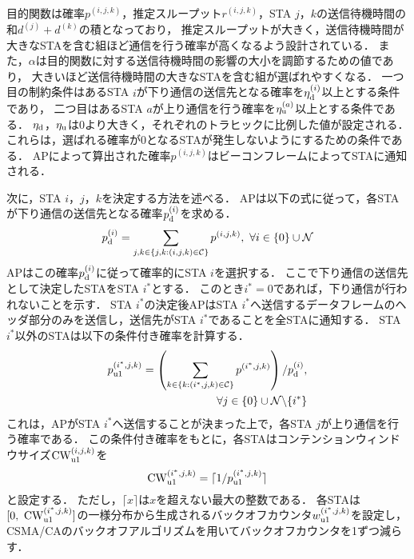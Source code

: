 \documentclass[technicalreport]{ieicej}
\newcommand{\sijk}{(i,j,k)}
\newcommand{\pijk}{p^{(i,j,k)}}
\newcommand{\rijk}{r^{(i,j,k)}}
\newcommand{\mthc}{\mathcal C}
\begin{document}
		\par
		目的関数は確率$\pijk$，推定スループット$\rijk$，STA $j$，$k$の送信待機時間の和$d^{(j)}+d^{(k)}$の積となっており，
		推定スループットが大きく，送信待機時間が大きなSTAを含む組ほど通信を行う確率が高くなるよう設計されている．
		また，$\alpha$は目的関数に対する送信待機時間の影響の大小を調節するための値であり，
		大きいほど送信待機時間の大きなSTAを含む組が選ばれやすくなる．
		一つ目の制約条件はあるSTA $i$が下り通信の送信先となる確率を$\eta_{\rm d}^{(i)}$以上とする条件であり，
		二つ目はあるSTA $a$が上り通信を行う確率を$\eta_{\rm u}^{(a)}$以上とする条件である．
		$\eta_{\rm d}$，$\eta_{\rm u}$は0より大きく，それぞれのトラヒックに比例した値が設定される．
		これらは，選ばれる確率が0となるSTAが発生しないようにするための条件である．
		APによって算出された確率$\pijk$はビーコンフレームによってSTAに通知される．
		\par
		次に，STA $i$，$j$，$k$を決定する方法を述べる．
		APは以下の式に従って，各STAが下り通信の送信先となる確率$p_{\rm d}^{(i)}$を求める．
		\begin{equation}
			p_{\rm d}^{(i)}= \sum_{j,k\in\{j,k:(i,j,k)\in{\mathcal C}\}}p^{(i,j,k)},\ \forall i \in \{0\}\cup{\mathcal N}
		\end{equation}
		APはこの確率$p_{\rm d}^{(i)}$に従って確率的にSTA $i$を選択する．
		ここで下り通信の送信先として決定したSTAをSTA $i^*$とする．
		このとき$i^*=0$であれば，下り通信が行われないことを示す．
		STA $i^*$の決定後APはSTA $i^*$へ送信するデータフレームのヘッダ部分のみを送信し，送信先がSTA $i^*$であることを全STAに通知する．
		STA $i^*$以外のSTAは以下の条件付き確率を計算する．
		\begin{align}
			p_{\rm u1}^{(i^*,j,k)}=\left(\sum_{k\in\{k:(i^*,j,k)\in\mthc\}} p^{(i^*,j,k)}\right) / p_{\rm d}^{(i)}, \\
			\qquad\qquad\forall j \in \{0\}\cup{\mathcal N}\backslash \{i^*\}
		\end{align}
		これは，APがSTA $i^*$へ送信することが決まった上で，各STA $j$が上り通信を行う確率である．
		この条件付き確率をもとに，各STAはコンテンションウィンドウサイズ${\rm CW}^{\sijk}_{\rm u1}$を
		\begin{equation}
			{\rm CW}^{(i^*,j,k)}_{\rm u1} = \lceil 1/p_{\rm u1}^{(i^*,j,k)} \rceil
		\end{equation}
		と設定する．
		ただし，$\lceil x \rceil$は$x$を超えない最大の整数である．
		各STAは$[0,\ {\rm CW}^{(i^*,j,k)}_{\rm u1}]$の一様分布から生成されるバックオフカウンタ$w_{\rm u1}^{(i^*,j,k)}$を設定し，
		CSMA/CAのバックオフアルゴリズムを用いてバックオフカウンタを1ずつ減らす．
\end{document}
